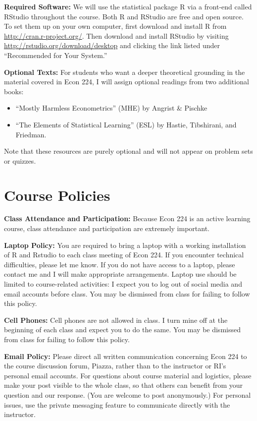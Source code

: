 \documentclass[11pt, letterpaper]{article}
\begin{document}
\noindent \textbf{Required Software:} 
We will use the statistical package R via a front-end called RStudio throughout the course. 
Both R and RStudio are free and open source. 
To set them up on your own computer, first download and install R from \url{http://cran.r-project.org/}. 
Then download and install RStudio by visiting \url{http://rstudio.org/download/desktop} and clicking the link listed under ``Recommended for Your System.'' 


\medskip

\noindent \textbf{Optional Texts:}
For students who want a deeper theoretical grounding in the material covered in Econ 224, I will assign optional readings from two additional books:
\begin{itemize}
  \item ``Mostly Harmless Econometrics'' (MHE) by Angrist \& Pischke
  \item ``The Elements of Statistical Learning'' (ESL) by Hastie, Tibshirani, and Friedman.
\end{itemize}
Note that these resources are purely optional and will not appear on problem sets or quizzes.


\section*{Course Policies}


\noindent \textbf{Class Attendance and Participation:}
Because Econ 224 is an active learning course, class attendance and participation are extremely important. 


\medskip

\noindent \textbf{Laptop Policy:} You are required to bring a laptop with a working installation of R and Rstudio to each class meeting of Econ 224.
If you encounter technical difficulties, please let me know.
If you do not have access to a laptop, please contact me and I will make appropriate arrangements.
Laptop use should be limited to course-related activities: I expect you to log out of social media and email accounts before class.
You may be dismissed from class for failing to follow this policy.

\medskip

\noindent \textbf{Cell Phones:} Cell phones are not allowed in class. 
I turn mine off at the beginning of each class and expect you to do the same.
You may be dismissed from class for failing to follow this policy.

\medskip

\noindent \textbf{Email Policy:}
Please direct all written communication concerning Econ 224 to the course discussion forum, Piazza, rather than to the instructor or RI's personal email accounts.
For questions about course material and logistics, please make your post visible to the whole class, so that others can benefit from your question and our response.
(You are welcome to post anonymously.)
For personal issues, use the private messaging feature to communicate directly with the instructor. 
\end{document}
